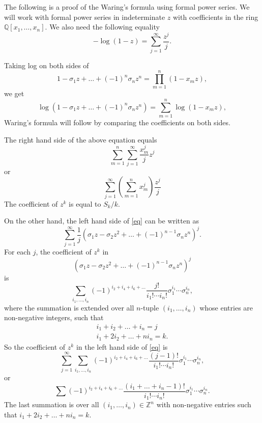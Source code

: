 \documentclass[12pt]{article}
\begin{document}
The following is a proof of the Waring's formula using formal
power series. We will work with formal power series in
indeterminate $z$ with coefficients in the ring
$\mathbb{Q}[x_1,\ldots,x_n]$. We also need the following equality
\[
  -\log(1-z) = \sum_{j=1}^\infty \frac{z^j}{j}.
\]

Taking log on both sides of
\[
  1 - \sigma_1z+\ldots + (-1)^n \sigma_n z^n =
  \prod_{m=1}^n(1-x_mz),
\]
we get
\begin{equation}
  \log(1 - \sigma_1z+\ldots + (-1)^n \sigma_n z^n) =
  \sum_{m=1}^n \log(1-x_mz), \label{eq}
\end{equation}
Waring's formula will follow by comparing the coefficients on both
sides.


The right hand side of the above equation equals
\[
  \sum_{m=1}^n \sum_{j=1}^\infty \frac{x_m^j}{j}z^j
\]
or
\[
  \sum_{j=1}^\infty \left( \sum_{m=1}^n  x_m^j \right)
  \frac{z^j}{j}
\]
The  coefficient of $z^k$ is equal to $S_k/k$.

On the other hand, the left hand side of \eqref{eq} can be written
as
\[
 \sum_{j=1}^\infty
 \frac{1}{j}(\sigma_1z-\sigma_2z^2+\ldots+(-1)^{n-1} \sigma_n
 z^n)^j.
\]
For each $j$, the coefficient of $z^k$ in
\[(\sigma_1z-\sigma_2z^2+\ldots+(-1)^{n-1} \sigma_n
 z^n)^j
\]
is
\[\sum_{i_1,\ldots,i_n} (-1)^{i_2+i_4+i_6+\ldots} \frac{j!}{i_1!\cdots
i_n!}\sigma_1^{i_1} \cdots \sigma_n^{i_n},
\]
where the summation is extended over all $n$-tuple
$(i_1,\ldots,i_n)$ whose entries are non-negative integers, such
that
\begin{gather*}
i_1+i_2+\ldots+i_n = j \\
i_1+2i_2+\ldots +ni_n = k.
\end{gather*}
So the coefficient of $z^k$ in the left hand side of \eqref{eq} is
\[
\sum_{j=1}^\infty \sum_{i_1,\ldots,i_n} (-1)^{i_2+i_4+i_6+\ldots}
\frac{(j-1)!}{i_1!\cdots i_n!}\sigma_1^{i_1} \cdots
\sigma_n^{i_n},
\]
or
\[\sum (-1)^{i_2+i_4+i_6+\ldots} \frac{(i_1+\ldots+i_n-1)!}{i_1!\cdots
i_n!}\sigma_1^{i_1} \cdots \sigma_n^{i_n}.
\]
The last summation is over all $(i_1,\ldots, i_n)\in \mathbb{Z}^n$
with non-negative entries such that $i_1+2i_2+\ldots+ni_n=k$.
\end{document}
